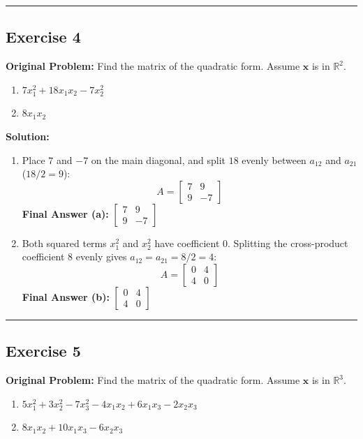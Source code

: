 \documentclass[11pt, letterpaper]{article}
\theoremstyle{definition}
\theoremstyle{remark}
\begin{document}
\medskip\hrule\medskip

\subsection*{Exercise 4}
\textbf{Original Problem:} Find the matrix of the quadratic form. Assume $\mathbf{x}$ is in $\mathbb{R}^2$.
\begin{enumerate}[label=\alph*.]
    \item $7x_1^2 + 18x_1x_2 - 7x_2^2$
    \item $8x_1x_2$
\end{enumerate}

\textbf{Solution:}
\begin{enumerate}[label=\alph*.]
    \item Place $7$ and $-7$ on the main diagonal, and split $18$ evenly between $a_{12}$ and $a_{21}$ ($18/2 = 9$):
    \[
    A = \begin{bmatrix} 7 & 9 \\ 9 & -7 \end{bmatrix}
    \]
    \textbf{Final Answer (a):} $\begin{bmatrix} 7 & 9 \\ 9 & -7 \end{bmatrix}$

    \item Both squared terms $x_1^2$ and $x_2^2$ have coefficient $0$. Splitting the cross-product coefficient $8$ evenly gives $a_{12} = a_{21} = 8/2 = 4$:
    \[
    A = \begin{bmatrix} 0 & 4 \\ 4 & 0 \end{bmatrix}
    \]
    \textbf{Final Answer (b):} $\begin{bmatrix} 0 & 4 \\ 4 & 0 \end{bmatrix}$
\end{enumerate}

\medskip\hrule\medskip

\subsection*{Exercise 5}
\textbf{Original Problem:} Find the matrix of the quadratic form. Assume $\mathbf{x}$ is in $\mathbb{R}^3$.
\begin{enumerate}[label=\alph*.]
    \item $5x_1^2 + 3x_2^2 - 7x_3^2 - 4x_1x_2 + 6x_1x_3 - 2x_2x_3$
    \item $8x_1x_2 + 10x_1x_3 - 6x_2x_3$
\end{enumerate}
\end{document}
